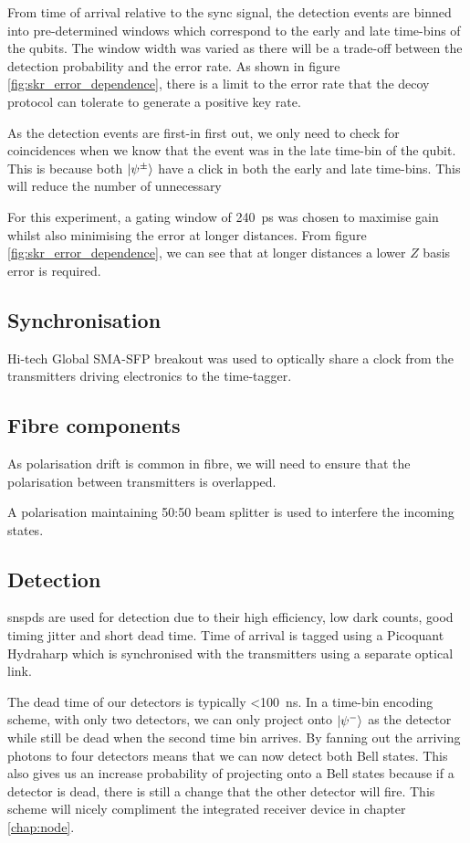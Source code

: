 From time of arrival relative to the sync signal, the detection events are binned into pre-determined windows which correspond to the early and late time-bins of the qubits. The window width was varied as there will be a trade-off between the detection probability and the error rate. As shown in figure \ref{fig:skr_error_dependence}, there is a limit to the error rate that the decoy protocol can tolerate to generate a positive key rate.

As the detection events are first-in first out, we only need to check for coincidences when we know that the event was in the late time-bin of the qubit. This is because both $\ket{\psi^\pm}$ have a click in both the early and late time-bins. This will reduce the number of unnecessary 

For this experiment, a gating window of \SI{240}{\ps} was chosen to maximise gain whilst also minimising the error at longer distances. From figure \ref{fig:skr_error_dependence}, we can see that at longer distances a lower $Z$ basis error is required.

\subsection{Synchronisation}

Hi-tech Global SMA-SFP breakout was used to optically share a clock from the transmitters driving electronics to the time-tagger. 

\subsection{Fibre components}

As polarisation drift is common in fibre, we will need to ensure that the polarisation between transmitters is overlapped. 

A polarisation maintaining 50:50 beam splitter is used to interfere the incoming states.

\subsection{Detection}

\Acsp{snspd} are used for detection due to their high efficiency, low dark counts, good timing jitter and short dead time. Time of arrival is tagged using a Picoquant Hydraharp which is synchronised with the transmitters using a separate optical link.

The dead time of our detectors is typically \SI{<100}{ns}. In a time-bin encoding scheme, with only two detectors, we can only project onto $\ket{\psi^{-}}$ as the detector while still be dead when the second time bin arrives. By fanning out the arriving photons to four detectors means that we can now detect both Bell states. This also gives us an increase probability of projecting onto a Bell states because if a detector is dead, there is still a change that the other detector will fire. This scheme will nicely compliment the integrated receiver device in chapter \ref{chap:node}.

